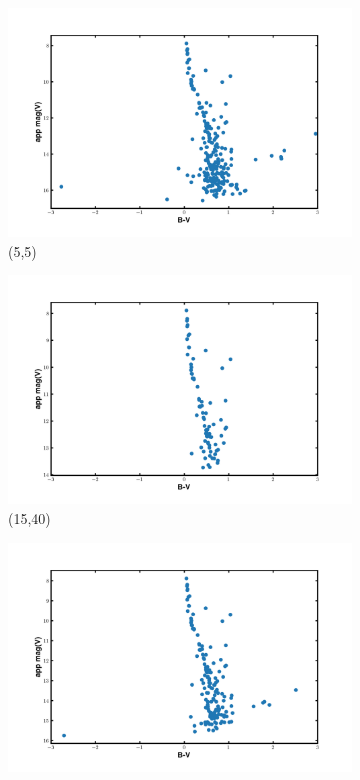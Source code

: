 \documentclass[12pt]{article}
\begin{document}
\begin{figure}[H]
    \centering
    \begin{subfigure}{.48\textwidth}
        \centering
        \includegraphics[width=\linewidth]{fig/(5,5)CMD.png}
        \caption{(5,5)}
    \end{subfigure}
    \hfill
    \begin{subfigure}{.48\textwidth}
        \centering
        \includegraphics[width=\linewidth]{fig/(15,40)CMD.png}
        \caption{(15,40)}
    \end{subfigure}
    \vspace{0.5cm} %
    \begin{subfigure}{.8\textwidth}
        \centering
        \includegraphics[width=\linewidth]{fig/(10,10)CMD.png}

\end{subfigure}
\end{figure}
\end{document}
